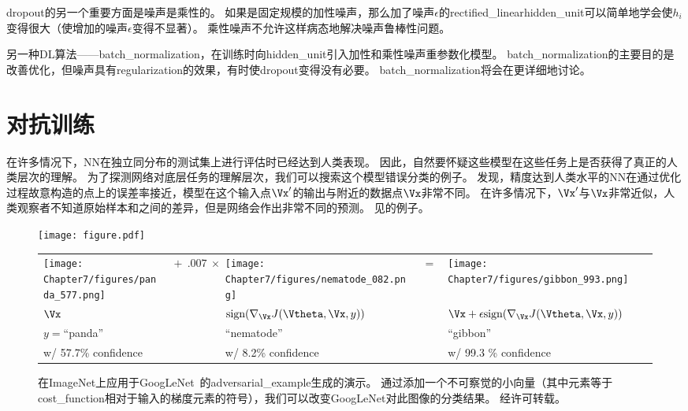 \gls{dropout}的另一个重要方面是噪声是乘性的。
如果是固定规模的加性噪声，那么加了噪声$\epsilon$的\gls{rectified_linear}\gls{hidden_unit}可以简单地学会使$h_i$变得很大（使增加的噪声$\epsilon$变得不显著）。
乘性噪声不允许这样病态地解决噪声鲁棒性问题。


另一种\gls{DL}算法——\gls{batch_normalization}，在训练时向\gls{hidden_unit}引入加性和乘性噪声重参数化模型。
\gls{batch_normalization}的主要目的是改善优化，但噪声具有\gls{regularization}的效果，有时使\gls{dropout}变得没有必要。
\gls{batch_normalization}将会在更详细地讨论。



\section{对抗训练}
\label{sec:adversarial_training}
在许多情况下，\gls{NN}在独立同分布的测试集上进行评估时已经达到人类表现。
因此，自然要怀疑这些模型在这些任务上是否获得了真正的人类层次的理解。
为了探测网络对底层任务的理解层次，我们可以搜索这个模型错误分类的例子。
\cite{Szegedy-ICLR2014}发现，精度达到人类水平的\gls{NN}在通过优化过程故意构造的点上的误差率接近，模型在这个输入点$\Vx'$的输出与附近的数据点$\Vx$非常不同。
在许多情况下，$\Vx'$与$\Vx$非常近似，人类观察者不知道原始样本和之间的差异，但是网络会作出非常不同的预测。
见的例子。
\begin{figure}[!htb]
\ifOpenSource
\centerline{\texttt{[image: figure.pdf]}}
\else
\centering
\begin{tabular}{>{\centering\arraybackslash}m{.2\figwidth}m{.5in}>{\centering\arraybackslash}m{.2\figwidth}m{.1in}>{\centering\arraybackslash}m{.2\figwidth}}
    \centering\arraybackslash
    \texttt{[image: Chapter7/figures/panda\_577.png]} &%
    \centering\arraybackslash%
$\ +\ .007\ \times$ &%
    \texttt{[image: Chapter7/figures/nematode\_082.png]} &%
    $=$ & %
    \texttt{[image: Chapter7/figures/gibbon\_993.png]} \\
    $\centering \Vx$     &%
    & $\text{sign} (\nabla_{\Vx} J(\Vtheta, \Vx, y) )$ & & $\Vx + \epsilon \text{sign} (\nabla_{\Vx} J(\Vtheta, \Vx, y) )$ \\
    $y=$``panda'' &                & ``nematode''     &   & ``gibbon'' \\
    w/ 57.7\% confidence &        &   w/ 8.2\% confidence & & w/ 99.3 \% confidence
\end{tabular}    
\fi
\caption[Fast adversarial sample generation]{
在ImageNet上应用于GoogLeNet~\citep{Szegedy-et-al-arxiv2014}的\gls{adversarial_example}生成的演示。
通过添加一个不可察觉的小向量（其中元素等于\gls{cost_function}相对于输入的梯度元素的符号），我们可以改变GoogLeNet对此图像的分类结果。
经\citet{Goodfellow-2015-adversarial}许可转载。
}
\label{fig:chap7_panda_577}
\end{figure}

